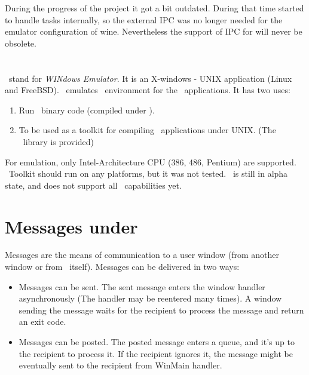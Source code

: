 During the progress of the project it got a bit outdated. During that
time \Wine{} started to handle tasks internally, so the external IPC
was no longer needed for the emulator configuration of
wine. Nevertheless the support of IPC for \libwine will never
be obsolete.




\clearpage
\appendix

\section{\Wine}
\label{sec:Wine}
\Wine\ stand for {\em WINdows Emulator}. It is an X-windows - UNIX 
application (Linux and FreeBSD). \Wine\ emulates \windoz\  environment
for the \windoz\  applications. It has two uses:
\begin{enumerate}
  \item Run \windoz\  binary code (compiled under \windoz).
  \item To be used as a toolkit for compiling \windoz\ applications
    under UNIX. (The \libwine\ library is provided)
\end{enumerate}
For emulation, only  Intel-Architecture CPU (386, 486, Pentium) are
supported. \libwine\ Toolkit should run on any platforms, but it was not
tested. \Wine\ is still in alpha state, and does not support all \windoz\
capabilities yet.


\section{Messages under \windoz}
\label{sec:WindozMsg}
Messages are the means of communication to a user window (from another
window or from \windoz\ itself).
Messages can be delivered in two ways:
\begin{itemize}
  \item Messages can be sent. The sent message enters the window handler
    asynchronously (The handler may be reentered many times).
    A window sending the message waits for the recipient to process
    the message and return an exit code.
  \item Messages can be posted. The posted message enters a queue, and
    it's up to the recipient to process it. If the recipient ignores
    it, the message might be eventually sent to the recipient from
    WinMain handler.
\end{itemize}

